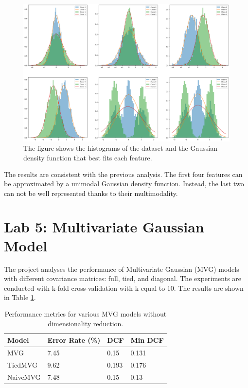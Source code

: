 \documentclass{article}
\begin{document}
\begin{figure}[ht]
    \centering
    \includegraphics[width=\textwidth]{images/dataset_gaussian.png}
    \caption{The figure shows the histograms of the dataset and the Gaussian density function that best fits each feature.}
    \label{fig:dataset_gaussian}
\end{figure}

The results are consistent with the previous analysis. The first four features can be approximated by a unimodal Gaussian density function. Instead, the last two can not be well represented thanks to their multimodality.


\section{Lab 5: Multivariate Gaussian Model}

The project analyses the performance of Multivariate Gaussian (MVG) models with different covariance matrices: full, tied, and diagonal. The experiments are conducted with k-fold cross-validation with k equal to 10. The results are shown in Table \ref{tab:mvg_performance}.

\begin{table}[ht!]
    \centering
    \begin{tabularx}{\textwidth}{lXXX}
        \toprule
        \textbf{Model} & \textbf{Error Rate (\%)} & \textbf{DCF} & \textbf{Min DCF} \\
        \midrule
        MVG      & 7.45 & 0.15 & 0.131 \\
        TiedMVG  & 9.62 & 0.193 & 0.176 \\
        NaiveMVG & 7.48 & 0.15 & 0.13 \\
        \bottomrule
    \end{tabularx}
    \caption{Performance metrics for various MVG models without dimensionality reduction.}
    \label{tab:mvg_performance}
\end{table}
\end{document}
